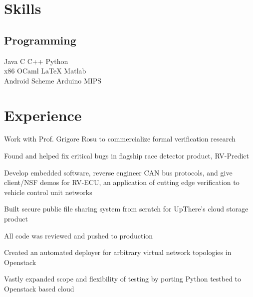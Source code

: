 \documentclass[]{bhargee-resume}
\begin{document}
\begin{minipage}[t]{0.33\textwidth}
\section{Skills}
\subsection{Programming}
Java \textbullet{}   C \textbullet{} C++ \textbullet{} Python \\
x86 \textbullet{} OCaml \textbullet{} \LaTeX \textbullet{} Matlab\\
Android \textbullet{} Scheme \textbullet{} Arduino \textbullet{} MIPS
\sectionsep


\end{minipage} 
\hfill
\begin{minipage}[t]{0.66\textwidth} 

\section{Experience}

\vspace{\topsep} %
\begin{tightemize}
\item Work with Prof. Grigore Rosu to commercialize formal verification research
\item Found and helped fix critical bugs in flagship race detector product, RV-Predict
\item Develop embedded software, reverse engineer CAN bus protocols, and give client/NSF demos for RV-ECU, an application of cutting edge verification to vehicle control unit networks
\end{tightemize}
\sectionsep

\begin{tightemize}
\item Built secure public file sharing system from scratch for UpThere's cloud storage product
\item All code was reviewed and pushed to production
\end{tightemize}
\sectionsep

\begin{tightemize}
\item Created an automated deployer for arbitrary virtual network topologies in Openstack
\item Vastly expanded scope and flexibility of testing by porting Python testbed to Openstack based cloud
\end{tightemize}
\sectionsep


\end{minipage}
\end{document}
